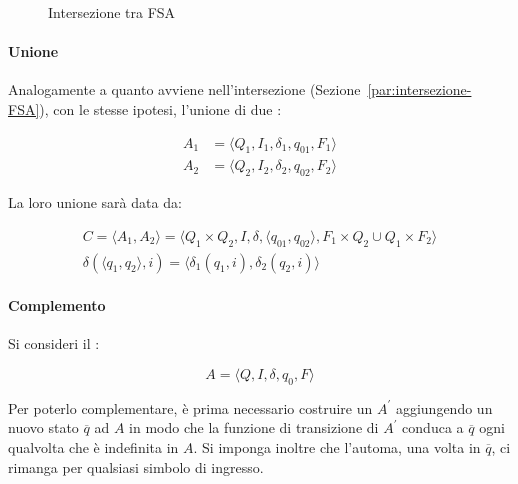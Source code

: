 \documentclass[italian, 10pt]{article}
\begin{document}
\begin{figure}[htbp]
  \bigskip
  \centering
  \caption{Intersezione tra FSA}
  \label{fig:intersezione-FSA-2}
  \bigskip
\end{figure}

\paragraph{Unione}
\label{par:FSA-unione}
Analogamente a quanto avviene nell'intersezione (Sezione~\ref{par:intersezione-FSA}), con le stesse ipotesi, l'unione di due \FSA:

\begin{align*}
  A_1 & = \langle Q_1, I_1, \delta_1, q_{01}, F_1 \rangle \\
  A_2 & = \langle Q_2, I_2, \delta_2, q_{02}, F_2 \rangle
\end{align*}

La loro unione sarà data da:

\begin{gather*}
  C = \langle A_1, A_2 \rangle = \langle Q_1 \times Q_2, I, \delta, \langle q_{01}, q_{02} \rangle, F_1 \times Q_2 \cup Q_1 \times F_2 \rangle \\
  \delta(\langle q_1, q_2 \rangle, i) = \langle \delta_1 (q_1, i), \delta_2(q_2, i) \rangle
\end{gather*}

\paragraph{Complemento}
Si consideri il \FSA:

\[ A = \langle Q, I, \delta, q_0, F \rangle \]

Per poterlo complementare, è prima necessario costruire un \FSA \(A^\prime\) aggiungendo un nuovo stato \(\overline{q}\) ad \(A\) in modo che la funzione di transizione di \(A^\prime\) conduca a \(\overline{q}\) ogni qualvolta che è indefinita in \(A\).
Si imponga inoltre che l'automa, una volta in \(\overline{q}\), ci rimanga per qualsiasi simbolo di ingresso.
\end{document}
